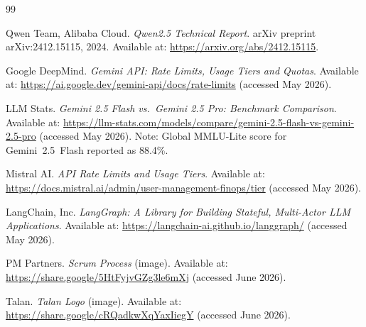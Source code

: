 \documentclass[12pt,a4paper]{report}
\begin{document}
\begin{thebibliography}{99}

Qwen Team, Alibaba Cloud.
\textit{Qwen2.5 Technical Report}.
arXiv preprint arXiv:2412.15115, 2024.
Available at: \url{https://arxiv.org/abs/2412.15115}.

Google DeepMind.
\textit{Gemini API: Rate Limits, Usage Tiers and Quotas}.
Available at: \url{https://ai.google.dev/gemini-api/docs/rate-limits}
(accessed May 2026).

LLM Stats.
\textit{Gemini 2.5 Flash vs.\ Gemini 2.5 Pro: Benchmark Comparison}.
Available at: \url{https://llm-stats.com/models/compare/gemini-2.5-flash-vs-gemini-2.5-pro}
(accessed May 2026).
Note: Global MMLU-Lite score for Gemini~2.5~Flash reported as 88.4\%.

Mistral AI.
\textit{API Rate Limits and Usage Tiers}.
Available at: \url{https://docs.mistral.ai/admin/user-management-finops/tier}
(accessed May 2026).


LangChain, Inc.
\textit{LangGraph: A Library for Building Stateful, Multi-Actor LLM Applications}.
Available at: \url{https://langchain-ai.github.io/langgraph/}
(accessed May 2026).

PM Partners.
\textit{Scrum Process} (image).
Available at: \url{https://share.google/5HtFyjvGZg3le6mXj}
(accessed June 2026).

Talan.
\textit{Talan Logo} (image).
Available at: \url{https://share.google/cRQadkwXqYaxIiegY}
(accessed June 2026).

\end{thebibliography}
\end{document}

